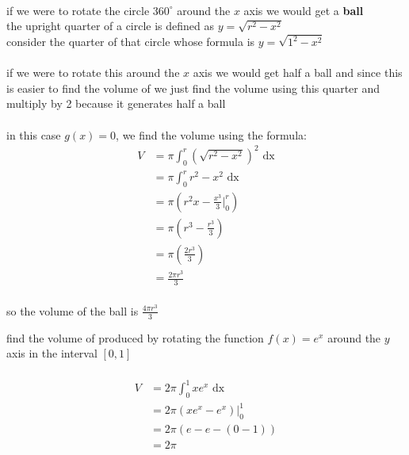 \documentclass[a4paper,12pt]{article}
\newcommand{\?}{\stackrel{?}{=}}
\begin{document}
\begin{definition}
\begin{my_example}
\\[0pt]

if we were to rotate the circle \(360^{\circ}\) around the \(x\) axis we would get a \textbf{ball}\\[0pt]

the upright quarter of a circle is defined as \(y=\sqrt{r^2-x^2}\)\\[0pt]

consider the quarter of that circle whose formula is \(y=\sqrt{1^2-x^2}\)\\[0pt]

\\[0pt]

if we were to rotate this around the \(x\) axis we would get half a ball and since this is easier to find the volume of we just find the volume using this quarter and multiply by 2 because it generates half a ball\\[0pt]

\\[0pt]

in this case \(g(x)=0\), we find the volume using the formula:\\[0pt]

\begin{align*}
  V &= \pi \int_0^r {\left(\sqrt{r^2-x^2}\right)}^2 \text{ dx}\\
  &= \pi \int_0^r r^2-x^2 \text{ dx}\\
  &= \pi \left(r^2x-\frac{x^3}{3} \Big|_0^r\right)\\
  &= \pi \left(r^3-\frac{r^3}{3}\right)\\
  &= \pi \left(\frac{2r^3}{3}\right)\\
  &= \frac{2\pi r^3}{3}\\
\end{align*}

so the volume of the ball is \(\frac{4\pi r^3}{3}\)\\[0pt]
\end{my_example}

\begin{my_example}
find the volume of produced by rotating the function \(f(x)=e^x\) around the \(y\) axis in the interval \([0,1]\)\\[0pt]

\\[0pt]

\begin{align*}
  V &= 2\pi \int_0^1 xe^x \text{ dx}\\  
  &= 2\pi (xe^x-e^x) \Big|_0^1\\
  &= 2\pi (e-e-(0-1))\\
  &= 2\pi
\end{align*}
\end{my_example}
\end{definition}
\end{document}
